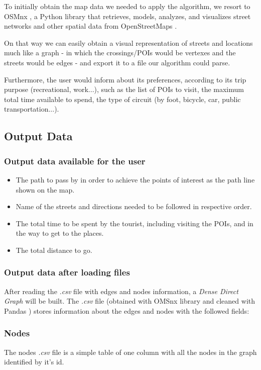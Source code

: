 \documentclass{article}
\begin{document}
To initially obtain the map data we needed to apply the algorithm, we resort to 
OSMnx \cite{OSMnx}, a Python library that retrieves, models, analyzes, and visualizes street networks and other spatial data from OpenStreetMaps \cite{OpenStreetMaps}. \par
On that way we can easily obtain a visual representation of streets and locations much like a graph - in which the crossings/POIs would be vertexes and the streets would be edges - and export it to a file our algorithm could parse. \par
Furthermore, the user would inform about its preferences, according to its trip purpose (recreational, work...), such as the list of POIs to visit, the maximum total time available to spend, the type of circuit (by foot, bicycle, car, public transportation...).

\subsection*{Output Data}
    \subsubsection*{Output data available for the user}
    \begin{itemize}
        \item The path to pass by in order to achieve the points of interest as the path line shown on the map.
        \item Name of the streets and directions needed to be followed in respective order.
        \item The total time to be spent by the tourist, including visiting the POIs, and in the way to get to the places.
        \item The total distance to go. 
    \end{itemize}
    
    \subsubsection*{Output data after loading files}
    After reading the \textit{.csv} file with edges and nodes information, a \textit{Dense Direct Graph} will be built. The \textit{.csv} file (obtained with OMSnx library \cite{OSMnx} and cleaned with Pandas \cite{Pandas}) stores information about the edges and nodes with the followed fields: \newline 
    \subsubsection*{Nodes}
        The nodes \textit{.csv} file is a simple table of one column with all the nodes in the graph identified by it's id. 
\end{document}
